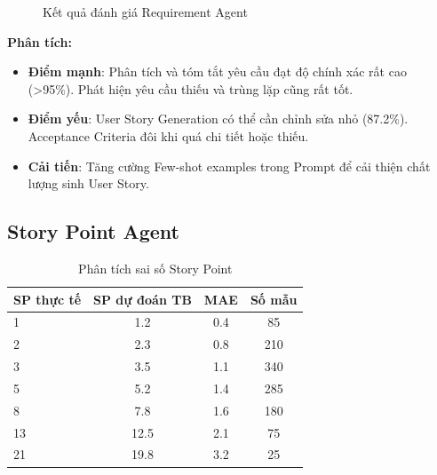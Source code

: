 \documentclass[12pt,a4paper]{report}
\begin{document}
\begin{figure}[H]
\centering
{}
\caption{Kết quả đánh giá Requirement Agent}
\label{fig:req_agent_eval}
\end{figure}

\textbf{Phân tích:}
\begin{itemize}
\item \textbf{Điểm mạnh}: Phân tích và tóm tắt yêu cầu đạt độ chính xác rất cao (>95\%). Phát hiện yêu cầu thiếu và trùng lặp cũng rất tốt.
\item \textbf{Điểm yếu}: User Story Generation có thể cần chỉnh sửa nhỏ (87.2\%). Acceptance Criteria đôi khi quá chi tiết hoặc thiếu.
\item \textbf{Cải tiến}: Tăng cường Few-shot examples trong Prompt để cải thiện chất lượng sinh User Story.
\end{itemize}

\subsection{Story Point Agent}

\begin{table}[H]
\centering
\caption{Phân tích sai số Story Point}
\begin{tabular}{|p{4cm}|c|c|c|}
\hline
\textbf{SP thực tế} & \textbf{SP dự đoán TB} & \textbf{MAE} & \textbf{Số mẫu} \\
\hline
1 & 1.2 & 0.4 & 85 \\
\hline
2 & 2.3 & 0.8 & 210 \\
\hline
3 & 3.5 & 1.1 & 340 \\
\hline
5 & 5.2 & 1.4 & 285 \\
\hline
8 & 7.8 & 1.6 & 180 \\
\hline
13 & 12.5 & 2.1 & 75 \\
\hline
21 & 19.8 & 3.2 & 25 \\
\hline
\end{tabular}
\label{tab:sp_error_analysis}
\end{table}
\end{document}

